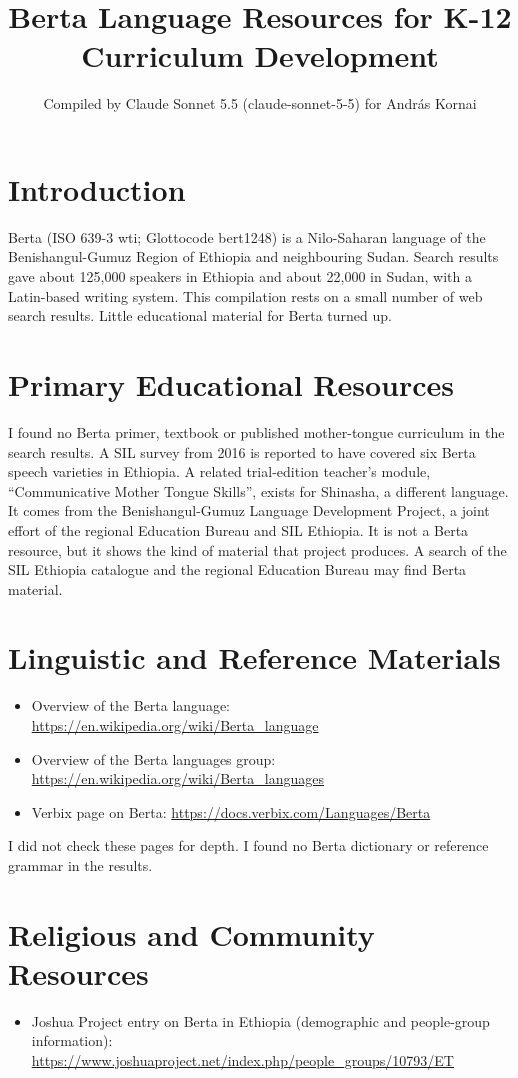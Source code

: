 \documentclass[12pt]{article}
\title{Berta Language Resources for K-12 Curriculum Development}
\author{Compiled by Claude Sonnet 5.5 (claude-sonnet-5-5) for Andr\'as Kornai}
\date{}
\begin{document}
\maketitle

\section{Introduction}
Berta (ISO 639-3 wti; Glottocode bert1248) is a Nilo-Saharan language of the Benishangul-Gumuz Region of Ethiopia and neighbouring Sudan. Search results gave about 125,000 speakers in Ethiopia and about 22,000 in Sudan, with a Latin-based writing system. This compilation rests on a small number of web search results. Little educational material for Berta turned up.

\section{Primary Educational Resources}
I found no Berta primer, textbook or published mother-tongue curriculum in the search results. A SIL survey from 2016 is reported to have covered six Berta speech varieties in Ethiopia. A related trial-edition teacher's module, ``Communicative Mother Tongue Skills'', exists for Shinasha, a different language. It comes from the Benishangul-Gumuz Language Development Project, a joint effort of the regional Education Bureau and SIL Ethiopia. It is not a Berta resource, but it shows the kind of material that project produces. A search of the SIL Ethiopia catalogue and the regional Education Bureau may find Berta material.

\section{Linguistic and Reference Materials}
\begin{itemize}
\item Overview of the Berta language: \url{https://en.wikipedia.org/wiki/Berta_language}
\item Overview of the Berta languages group: \url{https://en.wikipedia.org/wiki/Berta_languages}
\item Verbix page on Berta: \url{https://docs.verbix.com/Languages/Berta}
\end{itemize}
I did not check these pages for depth. I found no Berta dictionary or reference grammar in the results.

\section{Religious and Community Resources}
\begin{itemize}
\item Joshua Project entry on Berta in Ethiopia (demographic and people-group information): \url{https://www.joshuaproject.net/index.php/people_groups/10793/ET}
\end{itemize}
\end{document}
